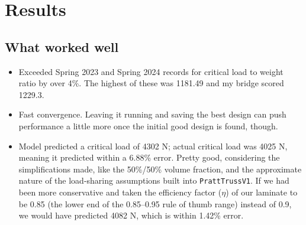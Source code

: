 \documentclass[11pt]{article}
\begin{document}
\section{Results}

\subsection{What worked well}
\begin{itemize}
  \item Exceeded Spring 2023 and Spring 2024 records for critical load to weight ratio by over 4\%. The highest of these was 1181.49 and my bridge scored 1229.3.
  \item Fast convergence. Leaving it running and saving the best design can push performance a little more once the initial good design is found, though.
  \item Model predicted a critical load of 4302 N; actual critical load was 4025 N, meaning it predicted within a 6.88\% error. Pretty good, considering the simplifications made, like the 50\%/50\% volume fraction, and the approximate nature of the load-sharing assumptions built into \texttt{PrattTrussV1}. If we had been more conservative and taken the efficiency factor (\(\eta\)) of our laminate to be 0.85 (the lower end of the 0.85--0.95 rule of thumb range) instead of 0.9, we would have predicted 4082 N, which is within 1.42\% error.
\end{itemize}

\noindent
\end{document}
